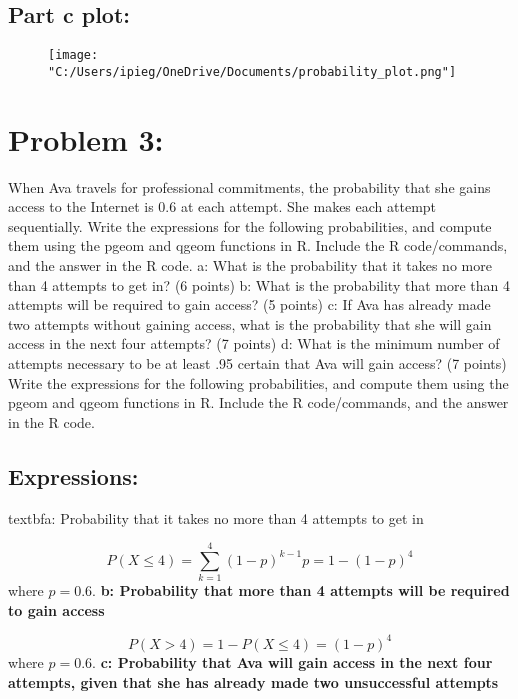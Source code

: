 \documentclass{article}
\begin{document}
\subsection{Part c plot:}
\begin{figure}[H]
    \centering
    \texttt{[image: "C:/Users/ipieg/OneDrive/Documents/probability\_plot.png"]}
    \label{fig:prob_plot}
\end{figure}

\section{Problem 3:}
When Ava travels for professional commitments, the probability that she gains access to
the Internet is 0.6 at each attempt. She makes each attempt sequentially. Write the
expressions for the following probabilities, and compute them using the pgeom and
qgeom functions in R. Include the R code/commands, and the answer in the R code.
a: What is the probability that it takes no more than 4 attempts to get in? (6 points)
b: What is the probability that more than 4 attempts will be required to gain access? (5
points)
c: If Ava has already made two attempts without gaining access, what is the probability
that she will gain access in the next four attempts? (7 points)
d: What is the minimum number of attempts necessary to be at least .95 certain that Ava
will gain access? (7 points)
Write the expressions for the following probabilities, and compute them using the pgeom
and qgeom functions in R. Include the R code/commands, and the answer in the R code. 

\subsection{Expressions:}
textbf{a: Probability that it takes no more than 4 attempts to get in}

\[
P(X \leq 4) = \sum_{k=1}^{4} (1 - p)^{k-1} p = 1 - (1 - p)^4
\]
where \( p = 0.6 \).
\newline
\newline
\textbf{b: Probability that more than 4 attempts will be required to gain access}

\[
P(X > 4) = 1 - P(X \leq 4) = (1 - p)^4
\]
where \( p = 0.6 \).
\newline
\newline
\textbf{c: Probability that Ava will gain access in the next four attempts, given that she has already made two unsuccessful attempts}
\end{document}
